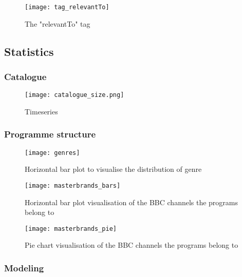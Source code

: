 \begin{figure}[h]
  \centering
  \texttt{[image: tag\_relevantTo]}
  \caption{The "relevantTo" tag}
  \label{fig:tag_relevantTo}
\end{figure}

\subsection{Statistics}

\subsubsection{Catalogue}

\begin{figure}[h]
  \centering
  \texttt{[image: catalogue\_size.png]}
  \caption{Timeseries }
  \label{fig:catalogue_size}
\end{figure}


\subsubsection{Programme structure}

\begin{figure}[h]
  \centering
  \texttt{[image: genres]}
  \caption{Horizontal bar plot to visualise the distribution of genre}
  \label{fig:genres}
\end{figure}

\begin{figure}[h]
  \centering
  \texttt{[image: masterbrands\_bars]}
  \caption{Horizontal bar plot visualisation of the BBC channels the programs belong to}
  \label{fig:masterbrands_bars}
\end{figure}

\begin{figure}[h]
  \centering
  \texttt{[image: masterbrands\_pie]}
  \caption{Pie chart visualisation of the BBC channels the programs belong to}
  \label{fig:masterbrands_pie}
\end{figure}

\subsubsection{Modeling}

